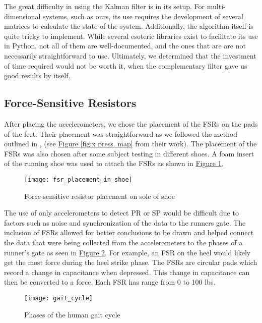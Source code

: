 The great difficulty in using the Kalman filter is in its setup.
For multi-dimensional systems, such as ours, its use requires the development of several matrices to calculate the state of the system.
Additionally, the algorithm itself is quite tricky to implement.
While several esoteric libraries exist to facilitate its use in Python, not all of them are well-documented, and the ones that are are not necessarily straightforward to use.
Ultimately, we determined that the investment of time required would not be worth it, when the complementary filter gave us good results by itself.\par

\subsection{Force-Sensitive Resistors}
After placing the accelerometers, we chose the placement of the FSRs on the pads of the feet.
Their placement was straightforward as we followed the method outlined in \cite{menz}, (see \hyperref[{fig:x press. map}]{Figure \ref*{fig:x press. map}} from their work).
The placement of the FSRs was also chosen after some subject testing in different shoes.
A foam insert of the running shoe was used to attach the FSRs as shown in \hyperref[{fig:x fsr_placement}]{Figure \ref*{fig:x fsr_placement}}.\par

\begin{figure}[h]
  \centering
  \texttt{[image: fsr\_placement\_in\_shoe]}
  \caption[FSR Placement]{Force-sensitive resistor placement on sole of shoe}
  \label{fig:x fsr_placement}
\end{figure}

The use of only accelerometers to detect PR or SP would be difficult due to factors such as noise and synchronization of the data to the runners gate.
The inclusion of FSRs allowed for better conclusions to be drawn and helped connect the data that were being collected from the accelerometers to the phases of a runner’s gate as seen in \hyperref[{fig:x gait cycle}]{Figure \ref*{fig:x gait cycle}}.
For example, an FSR on the heel would likely get the most force during the heel strike phase.
The FSRs are circular pads which record a change in capacitance when depressed.
This change in capacitance can then be converted to a force.
Each FSR has range from 0 to 100 lbs.\par

\begin{figure}[h]
  \centering
  \texttt{[image: gait\_cycle]}
  \caption[The Gait Cycle]{Phases of the human gait cycle \parencite{tekscan-cycle}}
  \label{fig:x gait cycle}
\end{figure}

